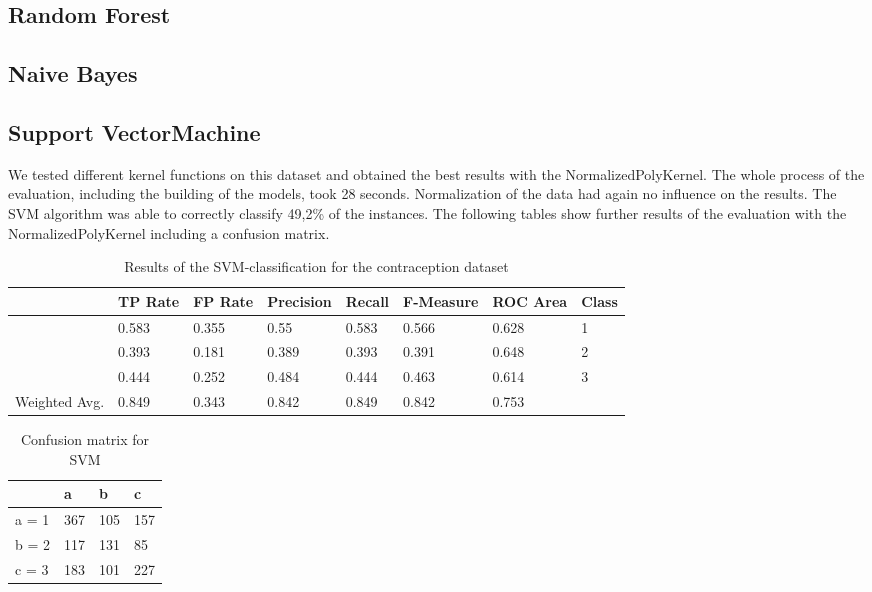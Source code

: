 \documentclass[paper=a4, fontsize=11pt]{scrartcl} %
\numberwithin{equation}{section} %
\numberwithin{figure}{section} %
\numberwithin{table}{section} %
\begin{document}
\subsection{Random Forest}


\subsection{Naive Bayes}


\subsection{Support VectorMachine}

We tested different kernel functions on this dataset and obtained the best results with the NormalizedPolyKernel. The whole process of the evaluation, including the building of the models, took 28 seconds. Normalization of the data had again no influence on the results. The SVM algorithm was able to correctly classify 49,2\% of the instances. The following tables show further results of the evaluation with the NormalizedPolyKernel including a confusion matrix.

\begin{table}[h]
\centering
\begin{tabular}{|llllllll|}
	\hline
	&								TP Rate   	&FP Rate   &Precision   &Recall  &F-Measure   &ROC Area  	&Class\\
	\hline
									&0.583     	&0.355     &0.55      	&0.583   &0.566   		&0.628    	&1\\
                 	&0.393     	&0.181     &0.389     	&0.393   &0.391      	&0.648    	&2\\
                 	&0.444     	&0.252     &0.484     	&0.444   &0.463      	&0.614    	&3\\
  \hline
	Weighted Avg.   & 0.849    & 0.343      &0.842   &  0.849     &0.842     & 0.753			&\\
	\hline
\end{tabular}
\caption{Results of the SVM-classification for the contraception dataset}
\end{table}

\vspace{6pt}

\begin{table}[h]
\centering
\begin{tabular}{|l|lll|}
	\hline
	      &a   &b   &c \\
	\hline
	a = 1 &367 &105 &157 \\
 	b = 2 &117 &131 &85 \\
 	c = 3 &183 &101 &227 \\
  \hline
\end{tabular}
\caption{Confusion matrix for SVM}
\end{table}
\end{document}

